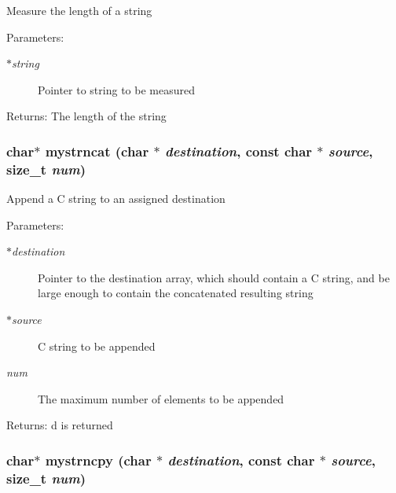 Measure the length of a string \begin{Desc}
\item[Parameters:]
\begin{description}
\item[{\em $\ast$string}]Pointer to string to be measured \end{description}
\end{Desc}
\begin{Desc}
\item[Returns:]The length of the string \end{Desc}
\subsubsection{\setlength{\rightskip}{0pt plus 5cm}char$\ast$ mystrncat (char $\ast$ {\em destination}, const char $\ast$ {\em source}, size\_\-t {\em num})}\label{mystring_8c_c2070ea5031f58dcfcc4320a1d6beb75}


Append a C string to an assigned destination \begin{Desc}
\item[Parameters:]
\begin{description}
\item[{\em $\ast$destination}]Pointer to the destination array, which should contain a C string, and be large enough to contain the concatenated resulting string \item[{\em $\ast$source}]C string to be appended \item[{\em num}]The maximum number of elements to be appended \end{description}
\end{Desc}
\begin{Desc}
\item[Returns:]d is returned \end{Desc}
\subsubsection{\setlength{\rightskip}{0pt plus 5cm}char$\ast$ mystrncpy (char $\ast$ {\em destination}, const char $\ast$ {\em source}, size\_\-t {\em num})}\label{mystring_8c_858f7c088b124224c6358aee22118bc9}



